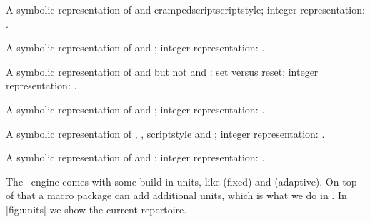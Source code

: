 \stopnewprimitive

\startnewprimitive[title={\prm {allscriptscriptstyles}}]

A symbolic representation of  and \prm
{crampedscriptscriptstyle}; integer representation: \the\allscriptscriptstyles.

\stopnewprimitive

\startnewprimitive[title={\prm {allscriptstyles}}]

A symbolic representation of  and ;
integer representation: \the\allscriptstyles.

\stopnewprimitive

\startnewprimitive[title={\prm {allsplitstyles}}]

A symbolic representation of  and  but not
 and : set versus reset; integer
representation: \the\allsplitstyles.

\stopnewprimitive

\startnewprimitive[title={\prm {alltextstyles}}]

A symbolic representation of  and ;
integer representation: \the\alltextstyles.

\stopnewprimitive

\startnewprimitive[title={\prm {alluncrampedstyles}}]

A symbolic representation of , , \prm
{scriptstyle} and ; integer representation:
\the\alluncrampedstyles.

\stopnewprimitive

\startnewprimitive[title={\prm {allunsplitstyles}}]

A symbolic representation of  and ; integer
representation: \the\allunsplitstyles.

\stopnewprimitive

\startnewprimitive[title={\prm {amcode}}]
\stopnewprimitive

\startnewprimitive[title={\prm {associateunit}}]

The \TEX\ engine comes with some build in units, like  (fixed) and
 (adaptive). On top of that a macro package can add additional units, which is
what we do in \CONTEXT. In  [fig:units] we show the current repertoire.

\startplacefigure[title=Available units,reference=fig:units]
    \showunitsmap[tight]
    \showunitsmaplegend
\stopplacefigure

